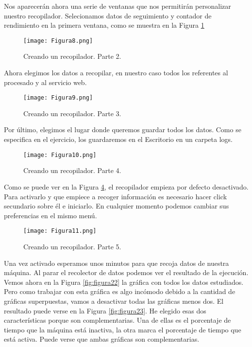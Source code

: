 Nos aparecerán ahora una serie de ventanas que nos permitirán personalizar nuestro recopilador. Selecionamos datos de seguimiento y contador de rendimiento en la
primera ventana, como se muestra en la Figura \ref{fig:figura8}

\begin{figure}[H] 
\centering
\texttt{[image: Figura8.png]}  
\caption{Creando un recopilador. Parte 2.}\label{fig:figura8}
\end{figure}

Ahora elegimos los datos a recopilar, en nuestro caso todos los referentes al procesado y al servicio web.

\begin{figure}[H] 
\centering
\texttt{[image: Figura9.png]}  
\caption{Creando un recopilador. Parte 3.}\label{fig:figura9}
\end{figure}

Por último, elegimos el lugar donde queremos guardar todos los datos. Como se especifica en el ejercicio, los guardaremos en el Escritorio en un carpeta logs. 

\begin{figure}[H] 
\centering
\texttt{[image: Figura10.png]}  
\caption{Creando un recopilador. Parte 4.}\label{fig:figura10}
\end{figure}

Como se puede ver en la Figura \ref{fig:figura11}, el recopilador empieza por defecto desactivado. Para activarlo y que empiece a recoger información es necesario 
hacer click secundario sobre él e iniciarlo. En cualquier momento podemos cambiar sus preferencias en el mismo menú.

\begin{figure}[H] 
\centering
\texttt{[image: Figura11.png]}  
\caption{Creando un recopilador. Parte 5.}\label{fig:figura11}
\end{figure}

Una vez activado esperamos unos minutos para que recoja datos de nuestra máquina. Al parar el recolector de datos podemos ver el resultado de la ejecución.
Vemos ahora en la Figura \ref{fig:figura22} la gráfica con todos los datos estudiados. Pero como trabajar con esta gráfica es algo incómodo debido a la cantidad de 
gráficas superpuestas, vamos a desactivar todas las gráficas menos dos. El resultado puede verse en la Figura \ref{fig:figura23}. He elegido esas dos características 
porque son complementarias. Una de ellas es el porcentaje de tiempo que la máquina está inactiva, la otra marca el porcentaje de tiempo que está activa. Puede verse 
que ambas gráficas son complementarias.


